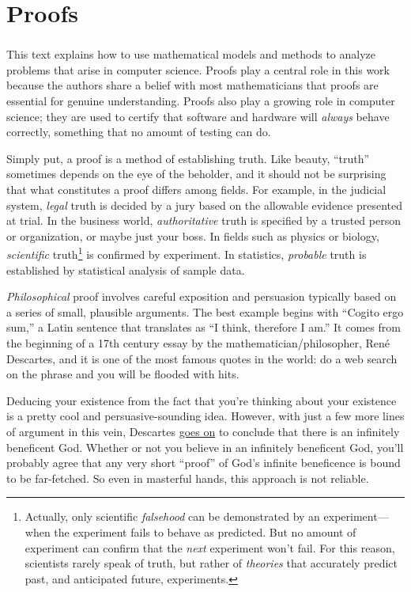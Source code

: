 \part{Proofs}
\label{part:proofs}

\partintro
\section*{}
This text explains how to use mathematical models and methods to analyze
problems that arise in computer science.  Proofs play a central role in
this work because the authors share a belief with most mathematicians that
proofs are essential for genuine understanding.  Proofs also play a
growing role in computer science; they are used to certify that software
and hardware will \emph{always} behave correctly, something that no amount
of testing can do.

Simply put, a proof is a method of establishing truth.  Like beauty,
``truth'' sometimes depends on the eye of the beholder, and it should
not be surprising that what constitutes a proof differs among fields.
For example, in the judicial system, \emph{legal} truth is decided by
a jury based on the allowable evidence presented at trial.  In the
business world, \emph{authoritative} truth is specified by a trusted
person or organization, or maybe just your boss.  In fields such as
physics or biology, \emph{scientific} truth\footnote{Actually, only
  scientific \emph{falsehood} can be demonstrated by an
  experiment---when the experiment fails to behave as predicted.  But
  no amount of experiment can confirm that the \emph{next} experiment
  won't fail.  For this reason, scientists rarely speak of truth, but
  rather of \emph{theories} that accurately predict past, and
  anticipated future, experiments.} is confirmed by experiment.  In statistics,
\emph{probable} truth is established by statistical analysis of sample
data.

\emph{Philosophical} proof involves careful exposition and
persuasion typically based on a series of small, plausible arguments.
The best example begins with ``Cogito ergo sum,'' a Latin sentence
that translates as ``I think, therefore I am.''  It comes from the
beginning of a 17th century essay by the mathematician/philosopher,
Ren\'e Descartes, and it is one of the most famous quotes in the
world: do a web search on the phrase and you will be flooded with
hits.

Deducing your existence from the fact that you're thinking about your
existence is a pretty cool and persuasive-sounding idea.  However,
with just a few more lines of argument in this vein, Descartes
\href{http://www.btinternet.com/~glynhughes/squashed/descartes.htm}{goes
  on} to conclude that there is an infinitely beneficent God.  Whether
or not you believe in an infinitely beneficent God, you'll probably
agree that any very short ``proof'' of God's infinite beneficence is
bound to be far-fetched.  So even in masterful hands, this approach is
not reliable.

